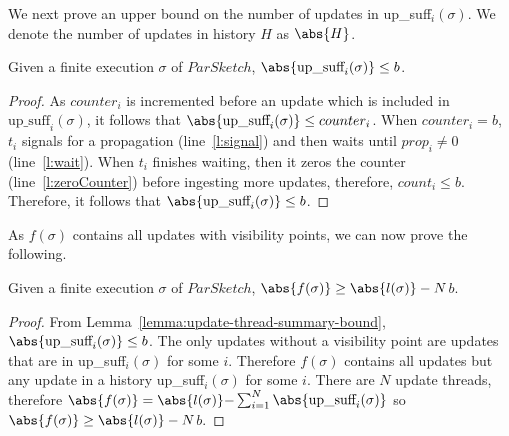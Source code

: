 We next prove an upper bound on the number of updates in up\_suff$_i(\sigma)$. We denote the
number of updates in history $H$ as $\abs{H}$.
\begin{lemma}
    Given a finite execution $\sigma$ of $ParSketch$, $\abs{\text{up\_suff}_i(\sigma)} \leq b$.
    \label{lemma:update-thread-summary-bound}
\end{lemma}
\begin{proof}
    As $counter_i$ is incremented before an update which is included in $\text{up\_suff}_i(\sigma)$,
    it follows that $\abs{\text{up\_suff}_i(\sigma)} \leq counter_i$. When $counter_i = b$, $t_i$
    signals for a propagation (line~\ref{l:signal}) and then waits until $prop_i \neq 0$ (line~\ref{l:wait}).
    When $t_i$ finishes waiting, then it zeros the counter (line~\ref{l:zeroCounter}) before ingesting
    more updates, therefore, $count_i \leq b$. Therefore, it follows that $\abs{\text{up\_suff}_i(\sigma)} \leq b$.
\end{proof}

As $f(\sigma)$ contains all updates with visibility points, we can now prove the following.
\begin{lemma}
    Given a finite execution $\sigma$ of $ParSketch$, $\abs{f(\sigma)} \geq \abs{l(\sigma)} - N$$b$.
    \label{lemma:f-bound}
\end{lemma}
\begin{proof}
    From Lemma~\ref{lemma:update-thread-summary-bound}, $\abs{\text{up\_suff}_i(\sigma)} \leq b$.
    The only updates without a visibility point are updates that are in up\_suff$_i(\sigma)$ for some $i$.
    Therefore $f(\sigma)$ contains all updates but any update in a history up\_suff$_i(\sigma)$ for some $i$.
    There are $N$ update threads, therefore $\abs{f(\sigma)} = \abs{l(\sigma)} - $$\sum_{i=1}^{N} \abs{\text{up\_suff}_i(\sigma)}$
    so $\abs{f(\sigma)} \geq \abs{l(\sigma)} - N $$b$.
\end{proof}

